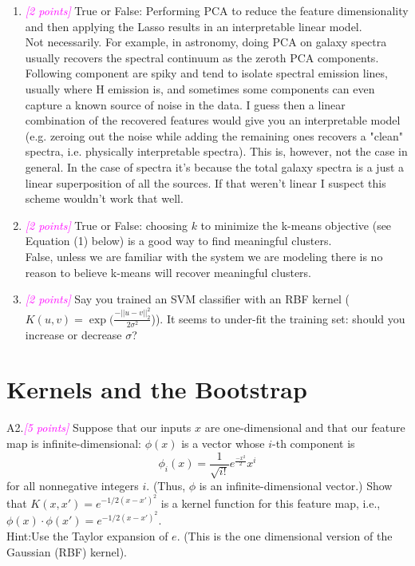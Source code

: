 \documentclass{article}
\newcommand{\1}{\mathbf{1}}
\newcommand{\points}[1]{\small\textcolor{magenta}{\emph{[#1 points]}} \normalsize}
\begin{document}
\begin{enumerate}
\item \points{2} True or False: Performing PCA to reduce the feature dimensionality and then applying the Lasso results in an interpretable linear model. \\
Not necessarily. For example, in astronomy, doing PCA on galaxy spectra usually recovers the spectral continuum as the zeroth PCA components. Following component are spiky and tend to isolate spectral emission lines, usually where H emission is, and sometimes some components can even capture a known source of noise in the data. I guess then a linear combination of the recovered features would give you an interpretable model (e.g. zeroing out the noise while adding the remaining ones recovers a "clean" spectra, i.e. physically interpretable spectra). This is, however, not the case in general. In the case of spectra it's because the total galaxy spectra is a just a linear superposition of all the sources. If that weren't linear I suspect this scheme wouldn't work that well.

\item \points{2} True or False: choosing $k$ to minimize the k-means objective (see Equation (1) below) is a good way to find meaningful clusters. \\
False, unless we are familiar with the system we are modeling there is no reason to believe k-means will recover meaningful clusters. 

\item \points{2} Say you trained an SVM classifier with an RBF kernel ($K(u,v) = \exp(\frac{-||u-v||^2_2}{ 2\sigma^2}$)). It seems to under-fit the training set: should you increase or decrease $\sigma$?
\end{enumerate}


\newpage
\section*{Kernels and the Bootstrap}
A2.\points{5} Suppose that our inputs $x$ are one-dimensional and that our feature map is infinite-dimensional: $\phi(x)$ is a vector whose $i$-th component is 
$$\phi_i(x) = \frac{1}{\sqrt{i!}}e^{\frac{-x^2}{2}}x^i$$
for all nonnegative integers $i$. (Thus, $\phi$ is an infinite-dimensional vector.) Show that $K(x,x') =e^{-1/2(x-x')^2}$ is a kernel function for this feature map, i.e., $\phi(x)\cdot \phi(x') = e^{-1/2(x-x')^2}$. \\ Hint:Use the Taylor expansion of $e$. (This is the one dimensional version of the Gaussian (RBF) kernel). \\
\end{document}
